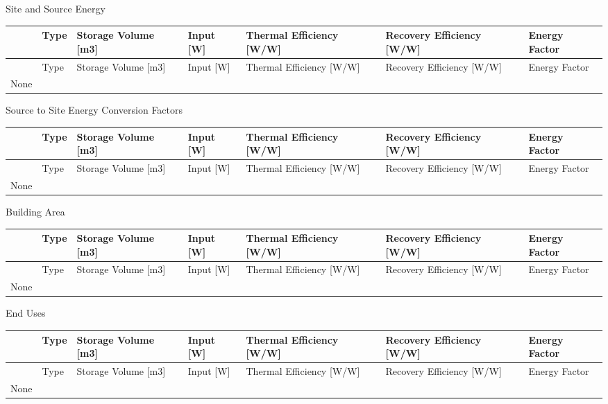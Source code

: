 Site and Source Energy

\begin{longtable}[c]{p{0.85in}p{0.85in}p{0.85in}p{0.85in}p{0.85in}p{0.85in}p{0.85in}}
\toprule 
~ & Type & Storage Volume [m3] & Input [W] & Thermal Efficiency [W/W] & Recovery Efficiency [W/W] & Energy Factor \tabularnewline
\midrule
\endfirsthead

\toprule 
~ & Type & Storage Volume [m3] & Input [W] & Thermal Efficiency [W/W] & Recovery Efficiency [W/W] & Energy Factor \tabularnewline
\midrule
\endhead

None & ~ & ~ & ~ & ~ & ~ & ~ \tabularnewline
\bottomrule
\end{longtable}

Source to Site Energy Conversion Factors

\begin{longtable}[c]{p{0.85in}p{0.85in}p{0.85in}p{0.85in}p{0.85in}p{0.85in}p{0.85in}}
\toprule 
~ & Type & Storage Volume [m3] & Input [W] & Thermal Efficiency [W/W] & Recovery Efficiency [W/W] & Energy Factor \tabularnewline
\midrule
\endfirsthead

\toprule 
~ & Type & Storage Volume [m3] & Input [W] & Thermal Efficiency [W/W] & Recovery Efficiency [W/W] & Energy Factor \tabularnewline
\midrule
\endhead

None & ~ & ~ & ~ & ~ & ~ & ~ \tabularnewline
\bottomrule
\end{longtable}

Building Area

\begin{longtable}[c]{p{0.85in}p{0.85in}p{0.85in}p{0.85in}p{0.85in}p{0.85in}p{0.85in}}
\toprule 
~ & Type & Storage Volume [m3] & Input [W] & Thermal Efficiency [W/W] & Recovery Efficiency [W/W] & Energy Factor \tabularnewline
\midrule
\endfirsthead

\toprule 
~ & Type & Storage Volume [m3] & Input [W] & Thermal Efficiency [W/W] & Recovery Efficiency [W/W] & Energy Factor \tabularnewline
\midrule
\endhead

None & ~ & ~ & ~ & ~ & ~ & ~ \tabularnewline
\bottomrule
\end{longtable}

End Uses

\begin{longtable}[c]{p{0.85in}p{0.85in}p{0.85in}p{0.85in}p{0.85in}p{0.85in}p{0.85in}}
\toprule 
~ & Type & Storage Volume [m3] & Input [W] & Thermal Efficiency [W/W] & Recovery Efficiency [W/W] & Energy Factor \tabularnewline
\midrule
\endfirsthead

\toprule 
~ & Type & Storage Volume [m3] & Input [W] & Thermal Efficiency [W/W] & Recovery Efficiency [W/W] & Energy Factor \tabularnewline
\midrule
\endhead

None & ~ & ~ & ~ & ~ & ~ & ~ \tabularnewline
\bottomrule
\end{longtable}

